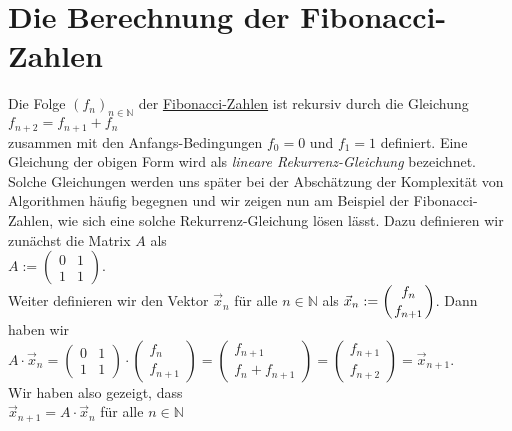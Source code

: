 \section{Die Berechnung der Fibonacci-Zahlen}
Die Folge $(f_n)_{n\in\mathbb{N}}$ der \href{http://de.wikipedia.org/wiki/Fibonacci-Folge}{Fibonacci-Zahlen} ist rekursiv durch die Gleichung
\\[0.2cm]
\hspace*{1.3cm}
$f_{n+2} = f_{n+1} + f_n$
\\[0.2cm]
zusammen mit den Anfangs-Bedingungen $f_0 = 0$ und $f_1 = 1$ definiert.   Eine Gleichung der obigen Form
wird als \emph{lineare Rekurrenz-Gleichung} bezeichnet.  Solche Gleichungen werden uns sp\"ater bei
der Absch\"atzung der Komplexit\"at von Algorithmen h\"aufig begegnen und wir zeigen nun am Beispiel der
Fibonacci-Zahlen, wie sich eine solche Rekurrenz-Gleichung l\"osen l\"asst.  Dazu definieren wir
zun\"achst die Matrix $A$ als
\\[0.2cm]
\hspace*{1.3cm}
$A := \left(
  \begin{array}{ll}
    0 & 1 \\
    1 & 1 
  \end{array}
\right)
$.
\\[0.2cm]
Weiter definieren wir den Vektor $\vec{x}_n$ f\"ur alle $n \in \mathbb{N}$ als 
$\displaystyle\vec{x}_n := \left(f_n \atop f_{n+1}\right)$.  Dann haben wir
\\[0.2cm]
\hspace*{1.3cm}
$A \cdot \vec{x}_n = \left(
  \begin{array}{ll}
    0 & 1 \\
    1 & 1 
  \end{array}
\right) \cdot \left(
  \begin{array}{c}
    f_n \\ f_{n+1}
  \end{array} 
\right) = 
\left(
  \begin{array}{c}
     f_{n+1} \\ f_n + f_{n+1}
  \end{array} 
\right) = \left(
  \begin{array}{c}
     f_{n+1} \\ f_{n+2}
  \end{array} 
\right) = \vec{x}_{n+1}.
$
\\[0.2cm]
Wir haben also gezeigt, dass
\\[0.2cm]
\hspace*{1.3cm}
$\vec{x}_{n+1} = A \cdot \vec{x}_n$ \quad f\"ur alle $n \in \mathbb{N}$
